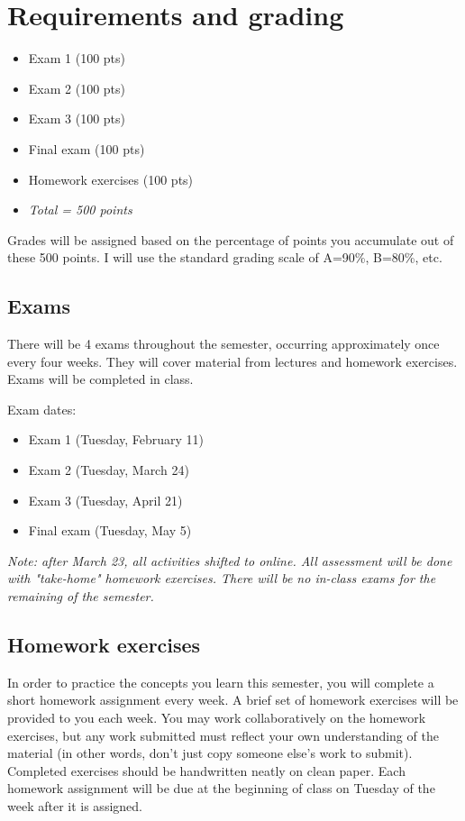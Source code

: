 \documentclass[10pt]{article}
\begin{document}
\section*{Requirements and grading}
\label{sec:orgcb23bab}
\begin{itemize}
\item Exam 1 (100 pts)
\item Exam 2 (100 pts)
\item Exam 3 (100 pts)
\item Final exam (100 pts)
\item Homework exercises (100 pts)
\item \emph{Total = 500 points}
\end{itemize}

Grades will be assigned based on the percentage of points you accumulate out of these 500 points.  I will use the standard grading scale of A=90\%, B=80\%, etc.

\subsection*{Exams}
\label{sec:org3d37357}
There will be 4 exams throughout the semester, occurring approximately once every four weeks.  They will cover material from lectures and homework exercises. Exams will be completed in class.

Exam dates:

\begin{itemize}
\item Exam 1 (Tuesday, February 11)
\item Exam 2 (Tuesday, March 24)
\item Exam 3 (Tuesday, April 21)
\item Final exam (Tuesday, May 5)
\end{itemize}

\emph{Note: after March 23, all activities shifted to online.  All assessment will be done with "take-home" homework exercises. There will be no in-class exams for the remaining of the semester.}

\subsection*{Homework exercises}
\label{sec:org795a5a8}
In order to practice the concepts you learn this semester, you will complete a short homework assignment every week. A brief set of homework exercises will be provided to you each week. You may work collaboratively on the homework exercises, but any work submitted must reflect your own understanding of the material (in other words, don't just copy someone else's work to submit). Completed exercises should be handwritten neatly on clean paper. Each homework assignment will be due at the beginning of class on Tuesday of the week after it is assigned.
\end{document}

